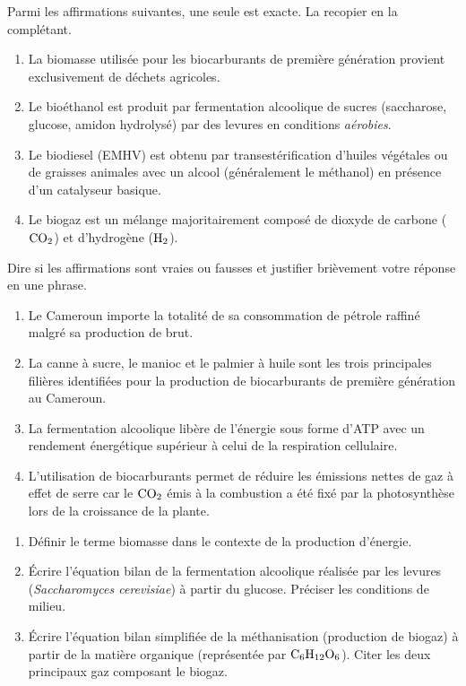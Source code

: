 \documentclass[11pt]{article}
\newcommand{\cle}[1]{{\popxbold\color{popdark}#1}}
\begin{document}
\begin{exercice}
Parmi les affirmations suivantes, une seule est exacte. La recopier en la complétant.
\begin{enumerate}
\item La biomasse utilisée pour les biocarburants de première génération provient exclusivement de déchets agricoles.
\item Le bioéthanol est produit par fermentation alcoolique de sucres (saccharose, glucose, amidon hydrolysé) par des levures en conditions \emph{aérobies}.
\item Le biodiesel (EMHV) est obtenu par transestérification d'huiles végétales ou de graisses animales avec un alcool (généralement le méthanol) en présence d'un catalyseur basique.
\item Le biogaz est un mélange majoritairement composé de dioxyde de carbone ($\ce{CO2}$) et d'hydrogène ($\ce{H2}$).
\end{enumerate}
\end{exercice}

\begin{exercice}
Dire si les affirmations sont vraies ou fausses et justifier brièvement votre réponse en une phrase.
\begin{enumerate}
\item Le Cameroun importe la totalité de sa consommation de pétrole raffiné malgré sa production de brut.
\item La canne à sucre, le manioc et le palmier à huile sont les trois principales filières identifiées pour la production de biocarburants de première génération au Cameroun.
\item La fermentation alcoolique libère de l'énergie sous forme d'ATP avec un rendement énergétique supérieur à celui de la respiration cellulaire.
\item L'utilisation de biocarburants permet de réduire les émissions nettes de gaz à effet de serre car le $\ce{CO2}$ émis à la combustion a été fixé par la photosynthèse lors de la croissance de la plante.
\end{enumerate}
\end{exercice}

\begin{exercice}
\begin{enumerate}
\item Définir le terme \cle{biomasse} dans le contexte de la production d'énergie.
\item Écrire l'équation bilan de la fermentation alcoolique réalisée par les levures (\emph{Saccharomyces cerevisiae}) à partir du glucose. Préciser les conditions de milieu.
\item Écrire l'équation bilan simplifiée de la méthanisation (production de biogaz) à partir de la matière organique (représentée par $\ce{C6H12O6}$). Citer les deux principaux gaz composant le biogaz.
\end{enumerate}
\end{exercice}
\end{document}
